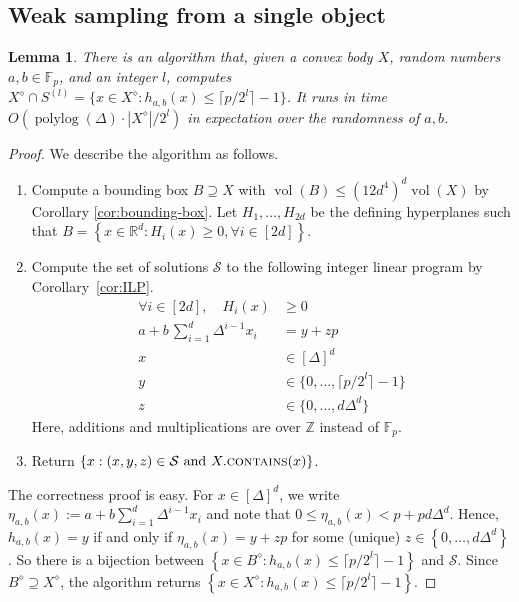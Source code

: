 \documentclass[11pt]{article}
\def\Real{\mathbb{R}}
\def\Integer{\mathbb{Z}}
\let\R\Real
\let\Z\Integer
\def\polylog{\operatorname{polylog}}
\def\vol{\operatorname{vol}}		%
\def\set#1{\left\{ #1 \right\}}
\newtheorem{lemma}[theorem]{Lemma}
\newcommand{\contains}{\textsc{contains}}
\newcommand{\F}{\mathbb{F}}
\newcommand{\class}[1]{\mathcal{#1}}
\newcommand{\discrete}[1]{#1^\diamond}
\begin{document}
\subsection{Weak sampling from a single object}
\begin{lemma}
    \label{lem:single-weak-sample}
    There is an algorithm  that, given a convex body $X$, random numbers $a,b \in \F_p$, and an integer $l$, computes $\discrete{X} \cap S^{(l)} = \{x \in \discrete{X} : h_{a,b}(x) \leq \lceil p/2^l \rceil - 1\}$. It runs in time $O(\polylog(\Delta) \cdot |\discrete{X}| / 2^l)$ in expectation over the randomness of $a,b$.
\end{lemma}
%
\begin{proof}
    We describe the algorithm  as follows.
    \begin{enumerate}
        \item Compute a bounding box $B \supseteq X$ with $\vol(B) \leq (12d^4)^d \vol(X)$ by Corollary \ref{cor:bounding-box}. Let $H_1, \dots, H_{2d}$ be the defining hyperplanes such that $B = \set{x \in \R^d : H_i(x) \geq 0, \forall i \in [2d]}$.
%
        \item Compute the set of solutions $\class{S}$ to the following integer linear program by Corollary~\ref{cor:ILP}.
        \begin{align*}
            \forall i \in [2d], \quad H_i(x) &\geq 0 \quad \\
            a + b\,\sum_{i=1}^d \Delta^{i-1} x_i &= y + zp \\
            x &\in [\Delta]^d \\
            y &\in \{0, \dots, \lceil p/2^l \rceil - 1\} \\
            z &\in \{0, \dots, d\Delta^d\}
        \end{align*}
        Here, additions and multiplications are over $\Z$ instead of $\F_p$.
%
        \item Return $\set{x : (x,y,z) \in \class{S} \text{ and } X.\contains(x)}$.
    \end{enumerate}
%
    The correctness proof is easy. For $x \in [\Delta]^d$, we write $\eta_{a,b}(x) := a + b \sum_{i=1}^d \Delta^{i-1} x_i$ and note that $0 \leq \eta_{a,b}(x) < p + pd\Delta^d$. Hence, $h_{a,b}(x) = y$ if and only if $\eta_{a,b}(x) = y+zp$ for some (unique) $z \in \set{0, \dots, d\Delta^d}$. So there is a bijection between $\set{x \in \discrete{B} : h_{a,b}(x) \leq \lceil p/2^l \rceil - 1}$ and $\class{S}$. Since $\discrete{B} \supseteq \discrete{X}$, the algorithm returns $\set{x \in \discrete{X} : h_{a,b}(x) \leq \lceil p/2^l \rceil - 1}$.

\end{proof}
\end{document}
